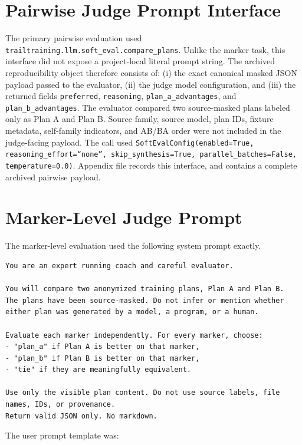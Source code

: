 \section{Pairwise Judge Prompt Interface}
\label{app:pairwise-prompt}
The primary pairwise evaluation used \texttt{trailtraining.llm.soft\_eval.compare\_plans}. Unlike the marker task, this interface did not expose a project-local literal prompt string. The archived reproducibility object therefore consists of: (i) the exact canonical masked JSON payload passed to the evaluator, (ii) the judge model configuration, and (iii) the returned fields \texttt{preferred}, \texttt{reasoning}, \texttt{plan\_a\_advantages}, and \texttt{plan\_b\_advantages}. The evaluator compared two source-masked plans labeled only as Plan A and Plan B. Source family, source model, plan IDs, fixture metadata, self-family indicators, and AB/BA order were not included in the judge-facing payload. The call used \texttt{SoftEvalConfig(enabled=True, reasoning\_effort=``none'', skip\_synthesis=True, parallel\_batches=False, temperature=0.0)}. Appendix file  records this interface, and  contains a complete archived pairwise payload.

\section{Marker-Level Judge Prompt}
\label{app:marker-prompt}
The marker-level evaluation used the following system prompt exactly.

\begin{lstlisting}
You are an expert running coach and careful evaluator.

You will compare two anonymized training plans, Plan A and Plan B.
The plans have been source-masked. Do not infer or mention whether either plan was generated by a model, a program, or a human.

Evaluate each marker independently. For every marker, choose:
- "plan_a" if Plan A is better on that marker,
- "plan_b" if Plan B is better on that marker,
- "tie" if they are meaningfully equivalent.

Use only the visible plan content. Do not use source labels, file names, IDs, or provenance.
Return valid JSON only. No markdown.
\end{lstlisting}

The user prompt template was:

